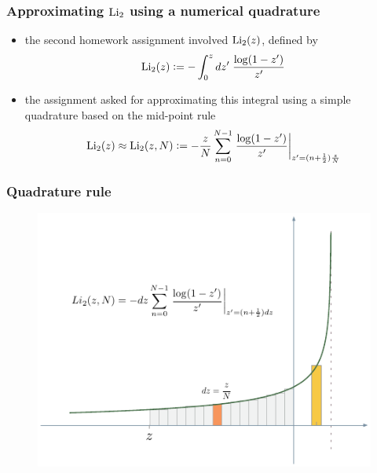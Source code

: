 %
%


\begin{frame}[fragile]
%
  \frametitle{Approximating $\mbox{\rm Li}_{2}$ using a numerical quadrature}
%
  \begin{itemize}
%
  \item the second homework assignment involved $\mbox{\rm Li}_{2}(z)$, defined by
    \begin{equation*}
      \mbox{\rm Li}_{2}(z) \mathrel{\mathop:}= - \int_{0}^{z} dz' \; \frac{\log(1-z')}{z'}
    \end{equation*}
%
    \item the assignment asked for approximating this integral using a simple
      quadrature based on the mid-point rule
      \begin{equation*}
      \mbox{\rm Li}_{2}(z) 
      \approx 
      \mbox{\rm Li}_{2}(z, N) 
      \mathrel{\mathop:}=
      - \frac{z}{N} \sum_{n=0}^{N-1} \left.
        \frac{\log(1-z')}{z'}
      \right|_{z'=(n+\frac{1}{2})\frac{z}{N}}
    \end{equation*}
%
  \end{itemize}
%
\end{frame}

\begin{frame}[fragile]
%
  \frametitle{Quadrature rule}
%
  \begin{figure}
    \centering
    \includegraphics[width=0.9\linewidth]{figures/dilog-quadrature.pdf}
    \label{fig:reduction-shared}
  \end{figure}
%
\end{frame}

